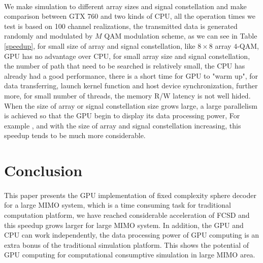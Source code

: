 \documentclass[12pt,a4paper,final]{article}
\begin{document}
\begin{spacing}{2.5}
\paragraph{} We make simulation to different array sizes and signal constellation and make comparison between GTX 760 and two kinds of CPU, all the operation times we test is based on 100 channel realizations, the transmitted data is generated randomly and modulated by $M$ QAM modulation scheme,  as we can see in Table \ref{speedup}, for small size of array and signal constellation, like $8\times 8$ array $4$-QAM, GPU has no advantage over CPU, for small array size and signal constellation, the number of path that need to be searched is relatively small, the CPU has already had a good performance, there is a short time for GPU to "warm up", for data transferring, launch kernel function and host device synchronization, further more, for small number of threads, the memory R/W latency is not well hided. When the size of array or signal constellation size  grows large, a large parallelism is achieved so that the GPU begin to display its data processing power, For example , and with the size of array and signal constellation increasing, this speedup tends to be much more considerable.
\section{Conclusion}\label{conclusion}
\paragraph{}This paper presents the GPU implementation of fixed complexity sphere decoder for a large MIMO system, which is a time consuming task for traditional computation platform, we have reached considerable acceleration of FCSD and this speedup grows larger for large MIMO system. In addition, the GPU and CPU can work independently, the data processing power of GPU computing is an extra bonus of the traditional simulation platform. This shows the potential of GPU computing for computational consumptive simulation in large MIMO area.      











\end{spacing}
\end{document}
